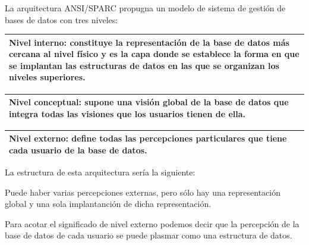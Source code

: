 \documentclass[10pt,a4paper,spanish]{report}
\begin{document}

La arquitectura ANSI/SPARC propugna un modelo de sistema de gestión de bases de datos con tres niveles:

\begin{center}
\begin{tabular}{|p{12cm}|}
\hline
\textcolor[rgb]{1,0.2,0.3}{\textbf{Nivel interno}}: constituye la representación de la base de datos más cercana al nivel físico y es la capa donde se establece la forma en que se implantan las estructuras de datos en las que se organizan los niveles superiores.\\
\hline
\end{tabular}

\begin{tabular}{|p{12cm}|}
\hline
\textcolor[rgb]{1,0.2,0.3}{\textbf{Nivel conceptual}}: supone una visión global de la base de datos que integra todas las visiones que los usuarios tienen de ella.\\
\hline
\end{tabular}

\begin{tabular}{|p{12cm}|}
\hline
\textcolor[rgb]{1,0.2,0.3}{\textbf{Nivel externo}}: define todas las percepciones particulares que tiene cada usuario de la base de datos.\\
\hline
\end{tabular}
\end{center}

La estructura de esta arquitectura sería la siguiente:



Puede haber varias percepciones externas, pero sólo hay una representación global y una sola implantanción de dicha representación.

Para acotar el significado de nivel externo podemos decir que la percepción de la base de datos de cada usuario se puede plasmar como una estructura de datos.
\end{document}
